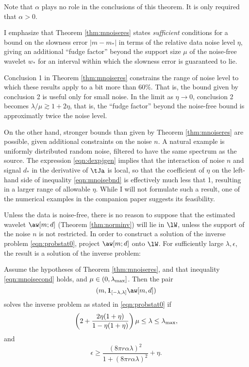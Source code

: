  Note that $\alpha$ plays no role in the
conclusions of this theorem. It is only required that $\alpha >0$.

 I emphasize that Theorem \ref{thm:mnoiseres} states {\em sufficient} conditions for a bound on
the slowness error $|m-m_*|$ in terms of the relative data noise level $\eta$,
giving an additional ``fudge factor'' beyond the support size $\mu$
of the noise-free wavelet $w_*$ for an interval within which the slowness error is
guaranteed to lie.

Conclusion 1 in Theorem \ref{thm:mnoiseres} constrains the range of
noise level to which these results apply to a bit more than 60\%. That
is, the bound given by conclusion 2 is useful only for small noise. In
the limit as $\eta \rightarrow 0$, conclusion 2 becomes
$\lambda/\mu \gtrsim 1 + 2\eta$, that is, the ``fudge factor'' beyond
the noise-free bound is approximatly twice the noise level.

On the other hand, stronger bounds than given by Theorem
\ref{thm:mnoiseres} are possible, given additional constraints on the
noise $n$. A natural example is uniformly distributed random noise,
filtered to have the same spectrum as the source. The expression
\ref{eqn:dexpjgen} implies that the interaction of noise $n$ and
signal $d_*$ in the derivative of $\tJa$ is local, so that the
coefficient of $\eta$ on the left-hand side of inequality
\ref{eqn:mnoisebnd} is effectively much less that 1, resulting in a
larger range of allowable $\eta$. While I will not formulate such a
result, one of the numerical examples in the companion paper
\cite[]{SymesChenMinkoff:21} suggests its feasibility.

Unless the data is noise-free, there is no reason to suppose that the
estimated wavelet $\aw[m;d]$ (Theorem \ref{thm:norminv}) will lie in
$\lW$, unless the support of the noise $n$ is not restricted. In order
to construct a solution of the inverse problem \ref{eqn:probstat0}, 
project $\aw[m;d]$ onto $\lW$. For sufficiently large $\lambda,
\epsilon$, the result is a solution of the inverse problem:

\begin{theorem}
  \label{thm:ipnoisesuf}
  Assume the hypotheses of Theorem \ref{thm:mnoiseres}, and that
  inequality \ref{eqn:mnoisecond} holds, and $\mu \in
  (0,\lambda_{\rm max}]$. Then the pair
  \[
    (m,{\bf 1}_{[-\lambda,\lambda]}\aw[m,d])
  \]
  solves the inverse problem as stated in \ref{eqn:probstat0} if
  \begin{equation}
    \label{eqn:ipnoiselam}
    \left( 2+\frac{2\eta(1+\eta)}{1-\eta(1+\eta)}\right)\mu \le \lambda
    \le \lambda_{\rm max}, 
  \end{equation}
  and
  \begin{equation}
    \label{eqn:ipnoiseeps}
    \epsilon \ge \frac{(8 \pi r \alpha\lambda)^2}{1 + (8 \pi r \alpha\lambda)^2}+\eta. 
  \end{equation}    
\end{theorem}

